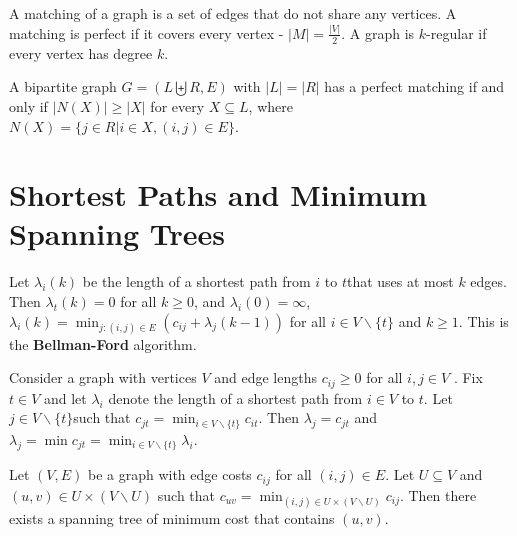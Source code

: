 \begin{defn}
  \label{sec:maxim-flows-perf-6}
  A matching of a graph is a set of edges that do not share any
  vertices.  A matching is perfect if it covers every vertex - $|M| =
  \frac{|V|}{2}$.  A graph is $k$-regular if every vertex has degree $k$.
\end{defn}

\begin{thm}
  \label{sec:maxim-flows-perf-7}
  A bipartite graph $G = (L \biguplus R, E)$ with $|L| = |R|$ has a
  perfect matching if and only if $|N(X)| \geq |X|$ for every $X
  \subseteq L$, where $N(X) = \{ j \in R | i \in X, (i, j) \in E \}$.
\end{thm}

\section{Shortest Paths and Minimum Spanning Trees}
\label{sec:short-paths-minim}

\begin{thm}
  \label{sec:short-paths-minim-1}
  Let $\lambda_{i}(k)$ be the length of a shortest path from $i$ to
  $t$that uses at most $k$ edges.  Then $\lambda_{t}(k) = 0$ for all
  $k \geq 0$, and $\lambda_{i}(0) = \infty$, $\lambda_{i}(k) =
  \min_{j: (i, j) \in E}(c_{ij} + \lambda_{j}(k-1))$ for all $i \in V
  \backslash \{ t \}$ and $k \geq 1$.  This is the
  \textbf{Bellman-Ford} algorithm.
\end{thm}

\begin{thm}
  \label{sec:short-paths-minim-2}
  Consider a graph with vertices $V$ and edge lengths $c_{ij} \geq 0$
  for all $i, j \in V$ . Fix $t \in V$ and let $\lambda_{i}$ denote
  the length of a shortest path from $i \in V$ to $t$.  Let $j \in V
  \backslash \{ t \} $such that $c_{jt} = \min_{i \in V \backslash \{
    t \}} c_{it}$. Then $\lambda_{j} = c_{jt}$ and $\lambda_{j} = \min
  c_{jt} = \min_{i \in V \backslash \{ t \}} \lambda_{i}$.
\end{thm}

\begin{thm}
  \label{sec:short-paths-minim-3}
  Let $(V, E)$ be a graph with edge costs $c_{ij}$ for all $(i, j) \in
  E$. Let $U \subseteq V$ and $(u, v) \in U \times (V \backslash U)$
  such that $c_{uv} = \min_{(i, j) \in U \times (V \backslash U)}
  c_{ij}$. Then there exists a spanning tree of minimum cost that
  contains $(u, v)$.
\end{thm}

